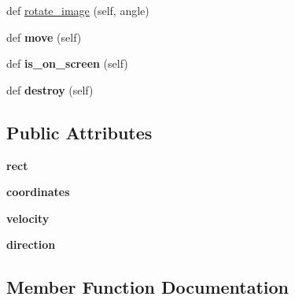 \begin{DoxyCompactItemize}
\item 
def \hyperlink{classMovingObject_1_1MovingObject_ac2299da57e4ff40983ed385c33ac4c63}{rotate\+\_\+image} (self, angle)
\item 
def {\bfseries move} (self)\hypertarget{classMovingObject_1_1MovingObject_a6060cd55441bc6f9473c4ad5520adc8c}{}\label{classMovingObject_1_1MovingObject_a6060cd55441bc6f9473c4ad5520adc8c}

\item 
def {\bfseries is\+\_\+on\+\_\+screen} (self)\hypertarget{classMovingObject_1_1MovingObject_a3c44ea1a39ee9bd15bb16295a7f6bf75}{}\label{classMovingObject_1_1MovingObject_a3c44ea1a39ee9bd15bb16295a7f6bf75}

\item 
def {\bfseries destroy} (self)\hypertarget{classMovingObject_1_1MovingObject_a7deae65ed90400dab791e8611e86c833}{}\label{classMovingObject_1_1MovingObject_a7deae65ed90400dab791e8611e86c833}

\end{DoxyCompactItemize}
\subsection*{Public Attributes}
\begin{DoxyCompactItemize}
\item 
{\bfseries rect}\hypertarget{classMovingObject_1_1MovingObject_a6e9925838ed3028698c1164d2d763245}{}\label{classMovingObject_1_1MovingObject_a6e9925838ed3028698c1164d2d763245}

\item 
{\bfseries coordinates}\hypertarget{classMovingObject_1_1MovingObject_a4d1309f9d6f6ad8ebe03ce5e14325045}{}\label{classMovingObject_1_1MovingObject_a4d1309f9d6f6ad8ebe03ce5e14325045}

\item 
{\bfseries velocity}\hypertarget{classMovingObject_1_1MovingObject_a7a0d3bf890cd7711bcdbaa2d25c4d0f4}{}\label{classMovingObject_1_1MovingObject_a7a0d3bf890cd7711bcdbaa2d25c4d0f4}

\item 
{\bfseries direction}\hypertarget{classMovingObject_1_1MovingObject_a52cda6e4073bf975ac10d85df1abaa91}{}\label{classMovingObject_1_1MovingObject_a52cda6e4073bf975ac10d85df1abaa91}

\end{DoxyCompactItemize}


\subsection{Member Function Documentation}
